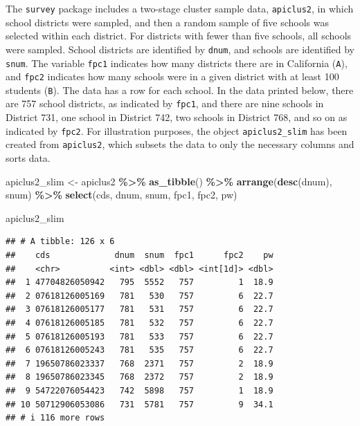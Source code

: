 \documentclass[
]{krantz}
\makeatletter
\newenvironment{Shaded}{\begin{snugshade}}{\end{snugshade}}
\newcommand{\FunctionTok}[1]{\textcolor[rgb]{0.27,0.27,0.27}{\textbf{#1}}}
\newcommand{\NormalTok}[1]{#1}
\newcommand{\OtherTok}[1]{\textcolor[rgb]{0.37,0.37,0.37}{#1}}
\newcommand{\SpecialCharTok}[1]{\textcolor[rgb]{0.43,0.43,0.43}{\textbf{#1}}}
\newenvironment{kframe}{%
\medskip{}
\setlength{\fboxsep}{.8em}
 \def\at@end@of@kframe{}%
 \ifinner\ifhmode%
  \def\at@end@of@kframe{\end{minipage}}%
  \begin{minipage}{\columnwidth}%
 \fi\fi%
 \def\FrameCommand##1{\hskip\@totalleftmargin \hskip-\fboxsep
 \colorbox{shadecolor}{##1}\hskip-\fboxsep
     \hskip-\linewidth \hskip-\@totalleftmargin \hskip\columnwidth}%
 \MakeFramed {\advance\hsize-\width
   \@totalleftmargin\z@ \linewidth\hsize
   \@setminipage}}%
 {\par\unskip\endMakeFramed%
 \at@end@of@kframe}
\renewenvironment{Shaded}{\begin{kframe}}{\end{kframe}}
\makeatother
\begin{document}
The \texttt{survey} package includes a two-stage cluster sample data, \texttt{apiclus2}, in which school districts were sampled, and then a random sample of five schools was selected within each district. For districts with fewer than five schools, all schools were sampled. School districts are identified by \texttt{dnum}, and schools are identified by \texttt{snum}. The variable \texttt{fpc1} indicates how many districts there are in California (\texttt{A}), and \texttt{fpc2} indicates how many schools were in a given district with at least 100 students (\texttt{B}). The data has a row for each school. In the data printed below, there are 757 school districts, as indicated by \texttt{fpc1}, and there are nine schools in District 731, one school in District 742, two schools in District 768, and so on as indicated by \texttt{fpc2}. For illustration purposes, the object \texttt{apiclus2\_slim} has been created from \texttt{apiclus2}, which subsets the data to only the necessary columns and sorts data.

\begin{Shaded}
\begin{Highlighting}[]
\NormalTok{apiclus2\_slim }\OtherTok{\textless{}{-}}
\NormalTok{  apiclus2 }\SpecialCharTok{\%\textgreater{}\%}
  \FunctionTok{as\_tibble}\NormalTok{() }\SpecialCharTok{\%\textgreater{}\%}
  \FunctionTok{arrange}\NormalTok{(}\FunctionTok{desc}\NormalTok{(dnum), snum) }\SpecialCharTok{\%\textgreater{}\%}
  \FunctionTok{select}\NormalTok{(cds, dnum, snum, fpc1, fpc2, pw)}

\NormalTok{apiclus2\_slim}
\end{Highlighting}
\end{Shaded}

\begin{verbatim}
## # A tibble: 126 x 6
##    cds             dnum  snum  fpc1      fpc2    pw
##    <chr>          <int> <dbl> <dbl> <int[1d]> <dbl>
##  1 47704826050942   795  5552   757         1  18.9
##  2 07618126005169   781   530   757         6  22.7
##  3 07618126005177   781   531   757         6  22.7
##  4 07618126005185   781   532   757         6  22.7
##  5 07618126005193   781   533   757         6  22.7
##  6 07618126005243   781   535   757         6  22.7
##  7 19650786023337   768  2371   757         2  18.9
##  8 19650786023345   768  2372   757         2  18.9
##  9 54722076054423   742  5898   757         1  18.9
## 10 50712906053086   731  5781   757         9  34.1
## # i 116 more rows
\end{verbatim}
\end{document}
